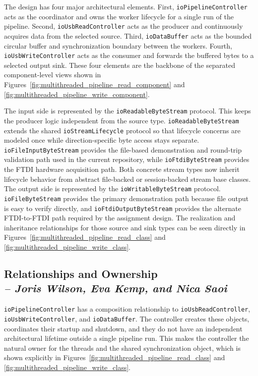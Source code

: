 The design has four major architectural elements. First, \texttt{ioPipelineController} acts as the coordinator and owns the worker lifecycle for a single run of the pipeline. Second, \texttt{ioUsbReadController} acts as the producer and continuously acquires data from the selected source. Third, \texttt{ioDataBuffer} acts as the bounded circular buffer and synchronization boundary between the workers. Fourth, \texttt{ioUsbWriteController} acts as the consumer and forwards the buffered bytes to a selected output sink. These four elements are the backbone of the separated component-level views shown in Figures~\ref{fig:multithreaded_pipeline_read_component} and \ref{fig:multithreaded_pipeline_write_component}.

The input side is represented by the \texttt{ioReadableByteStream} protocol. This keeps the producer logic independent from the source type. \texttt{ioReadableByteStream} extends the shared \texttt{ioStreamLifecycle} protocol so that lifecycle concerns are modeled once while direction-specific byte access stays separate. \texttt{ioFileInputByteStream} provides the file-based demonstration and round-trip validation path used in the current repository, while \texttt{ioFtdiByteStream} provides the FTDI hardware acquisition path. Both concrete stream types now inherit lifecycle behavior from abstract file-backed or session-backed stream base classes. The output side is represented by the \texttt{ioWritableByteStream} protocol. \texttt{ioFileByteStream} provides the primary demonstration path because file output is easy to verify directly, and \texttt{ioFtdiOutputByteStream} provides the alternate FTDI-to-FTDI path required by the assignment design. The realization and inheritance relationships for those source and sink types can be seen directly in Figures~\ref{fig:multithreaded_pipeline_read_class} and \ref{fig:multithreaded_pipeline_write_class}.

\subsection{Relationships and Ownership \\
\small{\textit{-- Joris Wilson, Eva Kemp, and Nica Saoi}}}
\label{Section::Relationships and Ownership}

\texttt{ioPipelineController} has a composition relationship to \texttt{ioUsbReadController}, \texttt{ioUsbWriteController}, and \texttt{ioDataBuffer}. The controller creates these objects, coordinates their startup and shutdown, and they do not have an independent architectural lifetime outside a single pipeline run. This makes the controller the natural owner for the threads and the shared synchronization object, which is shown explicitly in Figures~\ref{fig:multithreaded_pipeline_read_class} and \ref{fig:multithreaded_pipeline_write_class}. \\

